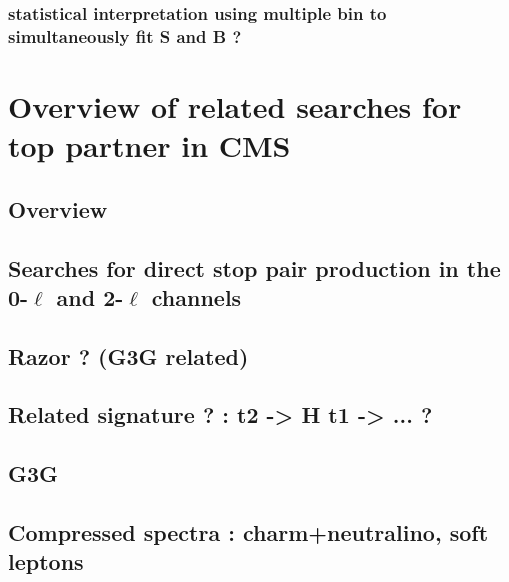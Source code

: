              \subsubsection{statistical interpretation using multiple bin to simultaneously fit S and B ?}
    
    \section{Overview of related searches for top partner in CMS \label{sec:analysis_overviewStopSearches}}
        
        \loremipsum

        \subsection{Overview}


        \subsection{Searches for direct stop pair production in the 0-$\ell$ and 2-$\ell$ channels}
        

        \subsection{Razor ? (G3G related)}
        

        \subsection{Related signature ? : t2 -> H t1 -> ... ?}
        \subsection{G3G}
        

        \subsection{Compressed spectra : charm+neutralino, soft leptons}


